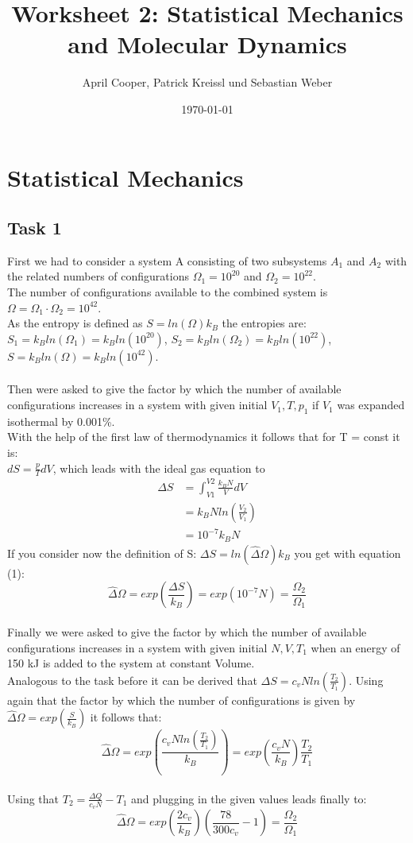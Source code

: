 \documentclass[12pt,a4paper]{scrartcl}
\author{April Cooper, Patrick Kreissl und Sebastian Weber}
\title{Worksheet 2: Statistical Mechanics and Molecular Dynamics}
\date{\today}
\begin{document}
\maketitle
\tableofcontents
\newpage

\section{Statistical Mechanics}
\subsection{Task 1}
First we had to consider a system A consisting of two subsystems $A_1$ and $A_2$ with the related numbers of configurations $\Omega_1= 10^20$ and $\Omega_2=10^22$.\\
The number of configurations available to the combined system  is $\Omega=\Omega_1\cdot \Omega_2= 10^{42}$.\\
As the entropy is defined as $S = ln(\Omega)k_B$ the entropies are:\\
$S_1=k_B ln(\Omega_1)=k_B ln(10^{20})$,
$S_2=k_B ln(\Omega_2)=k_B ln(10^{22})$,
$S=k_B ln(\Omega)=k_B ln(10^{42})$.\\
\\
Then were asked to give the factor by which the number of available configurations increases in a system with given initial $V_1,T,p_1$ if $V_1$ was expanded isothermal by 0.001\%.
\\
With the help of the first law of thermodynamics  it follows that for T = const it is:\\
$dS=\frac{p}{T}dV$, which leads with the ideal gas equation to
 \begin{align}
 \Delta S&=\int_{V1}^{V2} \frac{k_BN}{V}dV\nonumber\\
  &= k_BNln\left(\frac{V_2}{V_1}\right)\nonumber\\
  &=10^{-7}k_BN
   \end{align}
  If you consider now the definition of S: $\Delta S = ln( \hat \Delta \Omega)k_B $ you get with equation (1):\\
 \[ \hat \Delta\Omega = exp(\frac{\Delta S}{k_B}) = exp(10^{-7}N)=\frac{\Omega_2}{\Omega_1}\]
 \\
 Finally we were asked to give the factor by which the number of available configurations increases in a system with given initial $N,V,T_1$ when an energy of 150 kJ is  added to the system at constant Volume.\\
 Analogous to the task before it can be derived that $\Delta S = c_vNln\left(\frac{T_2}{T_1}\right)$.
 Using again that the factor by which the number of configurations is given by $\hat \Delta \Omega = exp(\frac{S}{k_B})$ it follows that:\\
 \[\hat \Delta \Omega = exp\left(\frac{c_vNln(\frac{T_2}{T_1})}{k_B}\right)=exp\left(\frac{c_vN}{k_B}\right)\frac{T_2}{T_1} \]\\
Using that $T_2=\frac{\Delta Q}{c_vN}-T_1$ and plugging in the given values leads finally to:\\
\[\hat \Delta \Omega = exp\left(\frac{2c_v}{k_B}\right)\left(\frac{78}{300c_v }-1\right)= \frac{\Omega_2}{\Omega_1}\]
\end{document}
